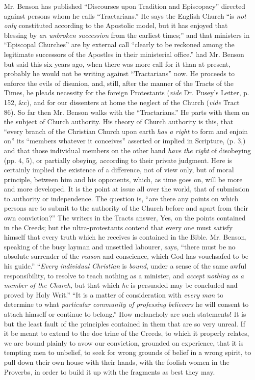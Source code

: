 Mr. Benson has published ``Discourses upon Tradition
and Episcopacy'' directed against persons whom he calls ``Tractarians.'' He
says the English Church ``is \emph{not
only} constituted
according to the Apostolic model, but it has enjoyed that blessing by \emph{an
unbroken succession} from
the earliest times;'' and that ministers in ``Episcopal Churches'' are by
external call ``clearly to be reckoned among the legitimate successors of
the Apostles in their ministerial office.'' had Mr. Benson but said this
six years ago, when there was more call for it than at present, probably
he would not be writing against ``Tractarians'' now. He proceeds to
enforce the evils of disunion, and, still, after the manner of the
Tracts of the Times, he pleads necessity for the foreign Protestants (\emph{vide}
Dr. Pusey's Letter, p. 152, \&c), and for our dissenters at home the
neglect of the Church (\emph{vide} Tract 86). So far then Mr. Benson
walks with the ``Tractarians.'' He parts with them on the subject of
Church authority. His theory of Church authority is this, that ``every
branch of the Christian Church upon earth \emph{has a right} to form and
enjoin on'' its ``members whatever it conceives'' asserted or implied in
Scripture, (p. 3,) and that those individual members on the other hand \emph{have
the right} of disobeying (pp. 4, 5), or partially obeying, according
to their private judgment. Here is certainly implied the existence of a
difference, not of view only, but of moral principle, between him and
his opponents, which, as time goes on, will be more and more developed.
It is the point at issue all over the world, that of submission to
authority or independence. The question is, ``are there any points on
which persons are to submit to the authority of the Church before and
apart from their own conviction?'' The writers in the Tracts answer, Yes,
on the points contained in the Creeds; but the ultra-protestants contend
that every one must satisfy himself that every truth which he receives
is contained in the Bible. Mr. Benson, speaking of the busy layman and
unsettled labourer, says, ``there must be no absolute surrender of the \emph{reason}
and conscience, which God has vouchsafed to be his guide.'' ``\emph{Every
individual Christian} is \emph{bound}, under a sense of the same
awful responsibility, to resolve to teach nothing as a minister, and \emph{accept
nothing as a member of the Church}, but that which \emph{he} is
persuaded may be concluded and proved by Holy Writ.'' ``It is a matter of
consideration with \emph{every man} to determine to what \emph{particular
community of professing believers} he will consent to attach himself
or continue to belong.'' How melancholy are such statements! It is but
the least fault of the principles contained in them that are so very
unreal. If it be meant to extend to the doc trine of the Creeds, to
which it properly relates, we are bound plainly to avow our conviction,
grounded on experience, that it is tempting men to unbelief, to seek for
wrong grounds of belief in a wrong spirit, to pull down their own house
with their hands, with the foolish women in the Proverbs, in order to
build it up with the fragments as best they may.

